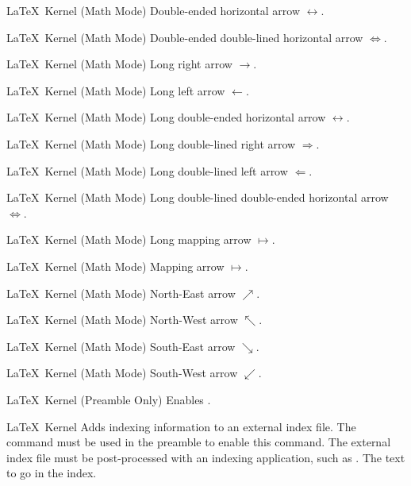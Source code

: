 %
 {}%
 {\LaTeX\ Kernel (Math Mode)}%
 {Double-ended horizontal arrow \ensuremath{\leftrightarrow}.}%
 {}

%
 {}%
 {\LaTeX\ Kernel (Math Mode)}%
 {Double-ended double-lined horizontal arrow \ensuremath{\Leftrightarrow}.}%
 {}

%
 {}%
 {\LaTeX\ Kernel (Math Mode)}%
 {Long right arrow \ensuremath{\longrightarrow}.}%
 {}

%
 {}%
 {\LaTeX\ Kernel (Math Mode)}%
 {Long left arrow \ensuremath{\longleftarrow}.}%
 {}

%
 {}%
 {\LaTeX\ Kernel (Math Mode)}%
 {Long double-ended horizontal arrow \ensuremath{\longleftrightarrow}.}%
 {}

%
 {}%
 {\LaTeX\ Kernel (Math Mode)}%
 {Long double-lined right arrow \ensuremath{\Longrightarrow}.}%
 {}

%
 {}%
 {\LaTeX\ Kernel (Math Mode)}%
 {Long double-lined left arrow \ensuremath{\Longleftarrow}.}%
 {}

%
 {}%
 {\LaTeX\ Kernel (Math Mode)}%
 {Long double-lined double-ended horizontal arrow \ensuremath{\Longleftrightarrow}.}%
 {}

%
 {}%
 {\LaTeX\ Kernel (Math Mode)}%
 {Long mapping arrow \ensuremath{\longmapsto}.}%
 {}

%
 {}%
 {\LaTeX\ Kernel (Math Mode)}%
 {Mapping arrow \ensuremath{\mapsto}.}%
 {}

%
 {}%
 {\LaTeX\ Kernel (Math Mode)}%
 {North-East arrow \ensuremath{\nearrow}.}%
 {}

%
 {}%
 {\LaTeX\ Kernel (Math Mode)}%
 {North-West arrow \ensuremath{\nwarrow}.}%
 {}

%
 {}%
 {\LaTeX\ Kernel (Math Mode)}%
 {South-East arrow \ensuremath{\searrow}.}%
 {}

%
 {}%
 {\LaTeX\ Kernel (Math Mode)}%
 {South-West arrow \ensuremath{\swarrow}.}%
 {}

%
 {}%
 {\LaTeX\ Kernel (Preamble Only)}%
 {Enables .}%
 {}

%
 {}%
 {\LaTeX\ Kernel}%
 {Adds indexing information to an external index file. The command
    must be used in the preamble to enable
   this command. The external index file must be post-processed with
   an indexing application, such as .}%
 {%
   \BeginArgList
      The text to go in the index.
   \EndArgList
 }

